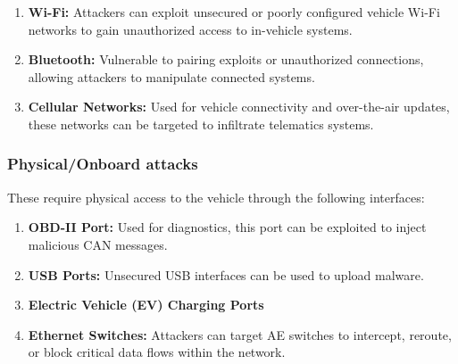 \documentclass{report}
\begin{document}
\begin{enumerate}
    \item \textbf{Wi-Fi:} Attackers can exploit unsecured or poorly configured vehicle Wi-Fi networks to gain unauthorized access to in-vehicle systems.
    \item \textbf{Bluetooth:} Vulnerable to pairing exploits or unauthorized connections, allowing attackers to manipulate connected systems.
    \item \textbf{Cellular Networks:} Used for vehicle connectivity and over-the-air updates, these networks can be targeted to infiltrate telematics systems.
\end{enumerate}

\subsubsection{Physical/Onboard attacks}
These require physical access to the vehicle through the following interfaces:

\begin{enumerate}
    \item \textbf{OBD-II Port:} Used for diagnostics, this port can be exploited to inject malicious CAN messages.\cite{klinedinst2016onboard}
    \item \textbf{USB Ports:} Unsecured USB interfaces can be used to upload malware.
    \item \textbf{Electric Vehicle (EV) Charging Ports}
    \item \textbf{Ethernet Switches:} Attackers can target AE switches to intercept, reroute, or block critical data flows within the network.
\end{enumerate}
\end{document}
